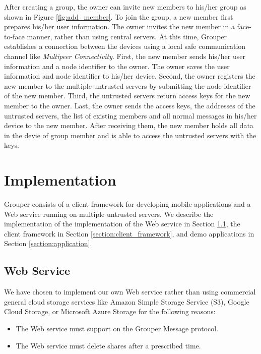 \documentclass[a4paper,11pt]{report}
\begin{document}
After creating a group, the owner can invite new members to his/her group as shown in Figure \ref{fig:add_member}. 
To join the group, a new member first prepares his/her user information. 
The owner invites the new member in a face-to-face manner, rather than using central servers. 
At this time, Grouper establishes a connection between the devices using a local safe communication channel like \emph{Multipeer Connectivity}\cite{mc}. 
First, the new member sends his/her user information and a node identifier to the owner. 
The owner saves the user information and node identifier to his/her device. 
Second, the owner registers the new member to the multiple untrusted servers by submitting the node identifier of the new member. 
Third, the untrusted servers return access keys for the new member to the owner. 
Last, the owner sends the access keys, the addresses of the untrusted servers, the list of existing members and all normal messages in his/her device to the new member.
After receiving them, the new member holds all data in the devie of group member and is able to access the untrusted servers with the keys.

\chapter{Implementation} \label{chapter:implementation}

Grouper consists of a client framework for developing mobile applications and a Web service running on multiple untrusted servers.
We describe the implementation of the implementation of the Web service in Section \ref{section:web_service}, the client framework in Section \ref{section:client_framework}, and demo applications in Section \ref{section:application}.

\section{Web Service} \label{section:web_service}

We have chosen to implement our own Web service rather than using commercial general cloud storage services like Amazon Simple Storage Service (S3), Google Cloud Storage, or Microsoft Azure Storage for the following reasons:

\begin{itemize}[leftmargin=7mm]
	\setlength{\itemsep}{1pt}
	\setlength{\parskip}{0pt}
	\setlength{\parsep}{0pt}
	\item The Web service must support on the Grouper Message protocol.
	\item The Web service must delete shares after a prescribed time.
\end{itemize}
\end{document}
